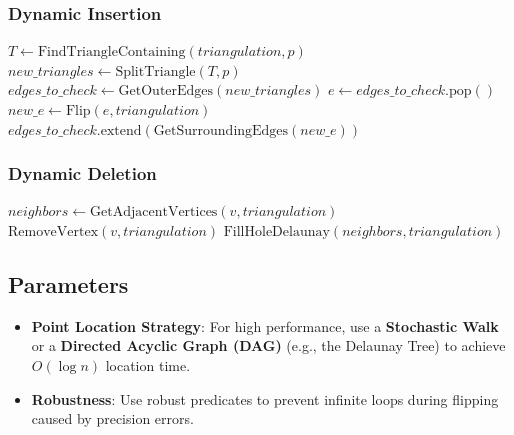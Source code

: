 \subsubsection*{Dynamic Insertion}

\begin{algorithm}[htbp]
\caption{Dynamic Point Insertion}
\label{alg:dynamic_insertion}
\begin{algorithmic}[1]
  \State $T \gets \text{FindTriangleContaining}(triangulation, p)$
  \State $new\_triangles \gets \text{SplitTriangle}(T, p)$
  \State $edges\_to\_check \gets \text{GetOuterEdges}(new\_triangles)$
    \State $e \gets edges\_to\_check.\text{pop}()$
      \State $new\_e \gets \text{Flip}(e, triangulation)$
      \State $edges\_to\_check.\text{extend}(\text{GetSurroundingEdges}(new\_e))$
    \EndIf
  \EndWhile
\EndFunction
\end{algorithmic}
\end{algorithm}

\subsubsection*{Dynamic Deletion}

\begin{algorithm}[htbp]
\caption{Dynamic Point Deletion}
\label{alg:dynamic_deletion}
\begin{algorithmic}[1]
  \State $neighbors \gets \text{GetAdjacentVertices}(v, triangulation)$
  \State $\text{RemoveVertex}(v, triangulation)$
  \State $\text{FillHoleDelaunay}(neighbors, triangulation)$
\EndFunction
\end{algorithmic}
\end{algorithm}

\subsection{Parameters}

\begin{itemize}
\item \textbf{Point Location Strategy}: For high performance, use a \textbf{Stochastic Walk} or a \textbf{Directed Acyclic Graph (DAG)} (e.g., the Delaunay Tree) to achieve $O(\log n)$ location time.
\item \textbf{Robustness}: Use robust predicates to prevent infinite loops during flipping caused by precision errors.
\end{itemize}

